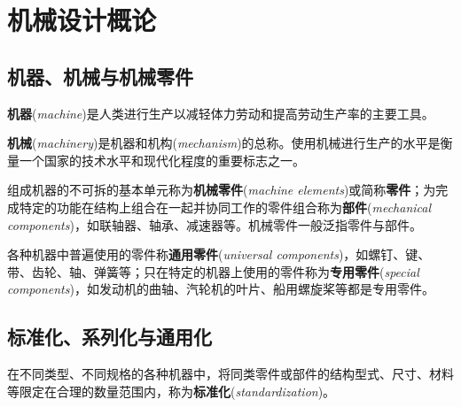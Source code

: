 \chapter{机械设计概论}
\label{chap:机械设计概论}

\section{机器、机械与机械零件}
\label{sec:机器机械与机械零件}

\begin{definition}[机器]
\label{def:机器}
\textbf{机器}(\emph{machine})是人类进行生产以减轻体力劳动和提高劳动生产率的主要工具。
\end{definition}

\begin{definition}[机械]
\label{def:机械}
\textbf{机械}(\emph{machinery})是机器和机构(\emph{mechanism})的总称。使用机械进行生产的水平是衡量一个国家的技术水平和现代化程度的重要标志之一。
\end{definition}

\begin{definition}[零件与部件]
\label{def:零件与部件}
组成机器的不可拆的基本单元称为\textbf{机械零件}(\emph{machine elements})或简称\textbf{零件}；为完成特定的功能在结构上组合在一起并协同工作的零件组合称为\textbf{部件}(\emph{mechanical components})，如联轴器、轴承、减速器等。机械零件一般泛指零件与部件。
\end{definition}

\begin{definition}[通用零件与专用零件]
\label{def:通用零件与专用零件}
各种机器中普遍使用的零件称\textbf{通用零件}(\emph{universal components})，如螺钉、键、带、齿轮、轴、弹簧等；只在特定的机器上使用的零件称为\textbf{专用零件}(\emph{special components})，如发动机的曲轴、汽轮机的叶片、船用螺旋桨等都是专用零件。
\end{definition}

\section{标准化、系列化与通用化}
\label{sec:三化}

\begin{definition}[标准化]
\label{def:标准化}
在不同类型、不同规格的各种机器中，将同类零件或部件的结构型式、尺寸、材料等限定在合理的数量范围内，称为\textbf{标准化}(\emph{standardization})。
\end{definition}

